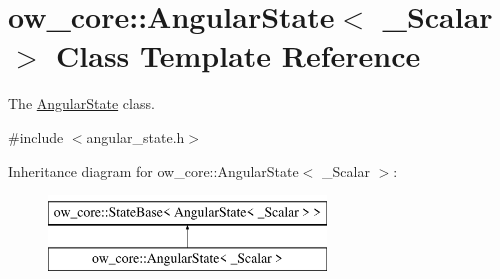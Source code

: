 \hypertarget{classow__core_1_1AngularState}{}\section{ow\+\_\+core\+:\+:Angular\+State$<$ \+\_\+\+Scalar $>$ Class Template Reference}
\label{classow__core_1_1AngularState}


The \hyperlink{classow__core_1_1AngularState}{Angular\+State} class.  




{\ttfamily \#include $<$angular\+\_\+state.\+h$>$}

Inheritance diagram for ow\+\_\+core\+:\+:Angular\+State$<$ \+\_\+\+Scalar $>$\+:\begin{figure}[H]
\begin{center}
\leavevmode
\includegraphics[height=2.000000cm]{dc/d76/classow__core_1_1AngularState}
\end{center}
\end{figure}
